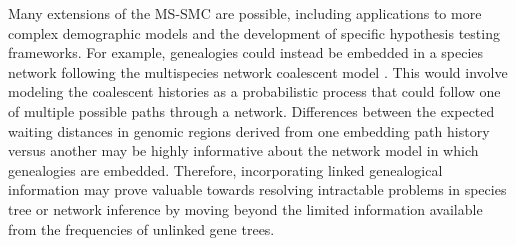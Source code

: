 \documentclass[11pt]{article}
\begin{document}
Many extensions of the MS-SMC are possible, including applications to more
complex demographic models and the development of specific hypothesis testing
frameworks. 
For example, genealogies could instead
be embedded in a species network following the multispecies network coalescent model 
\citep{wen_bayesian_2016}. This would involve modeling the coalescent histories as a 
probabilistic process that could follow one of multiple possible paths through a network.
Differences between the expected waiting distances in genomic regions derived from 
one embedding path history versus another may be highly informative about the 
network model in which genealogies are embedded. 
Therefore, incorporating linked genealogical information may prove valuable 
towards resolving intractable problems in species tree or network
inference by moving beyond the limited information available 
from the frequencies of unlinked gene trees.




\end{document}
